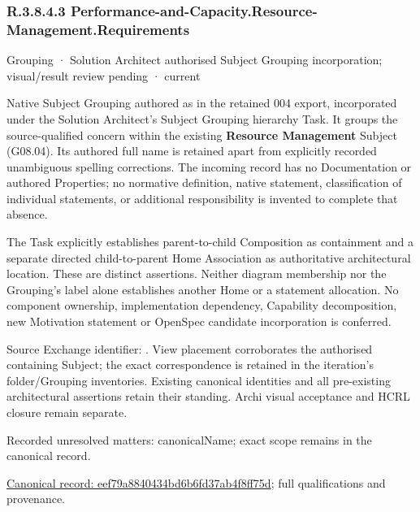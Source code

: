 \subsubsection*{R.3.8.4.3 Performance-and-Capacity.Resource-Management.Requirements}
\label{navigation:R.3.8.4.3}

\label{element:eef79a8840434bd6b6fd37ab4f8ff75d}
{\small Grouping · Solution Architect authorised Subject Grouping incorporation; visual/result review pending · current}\par

Native Subject Grouping authored as \texttt{} in the retained 004 export,
incorporated under the Solution Architect's Subject Grouping hierarchy Task.
It groups the source-qualified \texttt{} concern within
the existing \textbf{Resource Management} Subject (G08.04). Its authored full name
is retained apart from explicitly recorded unambiguous spelling corrections.
The incoming record has no Documentation or authored Properties; no normative
definition, native statement, classification of individual statements, or
additional responsibility is invented to complete that absence.



The Task explicitly establishes parent-to-child Composition as containment and
a separate directed child-to-parent Home Association as authoritative architectural
location. These are distinct assertions. Neither diagram membership nor the
Grouping's label alone establishes another Home or a statement allocation.
No component ownership, implementation dependency, Capability decomposition,
new Motivation statement or OpenSpec candidate incorporation is conferred.



Source Exchange identifier: \texttt{}. View placement corroborates
the authorised containing Subject; the exact correspondence is retained in the
iteration's folder/Grouping inventories. Existing canonical identities and all
pre-existing architectural assertions retain their standing. Archi visual
acceptance and HCRL closure remain separate.


{\small Recorded unresolved matters: canonicalName; exact scope remains in the canonical record.}\par
{\footnotesize \href{../../../../continuum/grouping/eef79a8840434bd6b6fd37ab4f8ff75d.md}{Canonical record: eef79a8840434bd6b6fd37ab4f8ff75d}; full qualifications and provenance.}\par
